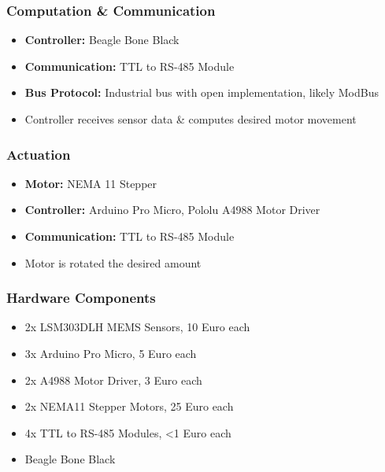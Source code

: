 \documentclass{beamer}
\begin{document}
\begin{frame}
	\frametitle{Computation \& Communication}
	\begin{itemize}
		\item \textbf{Controller:} Beagle Bone Black
		\item \textbf{Communication:} TTL to RS-485 Module
		\item \textbf{Bus Protocol:} Industrial bus with open implementation, likely ModBus
		\item Controller receives sensor data \& computes desired motor movement
	\end{itemize}
\end{frame}

\begin{frame}
	\frametitle{Actuation}
	\begin{itemize}
		\item \textbf{Motor:} NEMA 11 Stepper
		\item \textbf{Controller:} Arduino Pro Micro, Pololu A4988 Motor Driver
		\item \textbf{Communication:} TTL to RS-485 Module
		\item Motor is rotated the desired amount
	\end{itemize}
\end{frame}

\begin{frame}
  \frametitle{Hardware Components}
	\begin{itemize}
		\item 2x LSM303DLH MEMS Sensors, 10 Euro each
		\item 3x Arduino Pro Micro,  5 Euro each
		\item 2x A4988 Motor Driver, 3 Euro each
		\item 2x NEMA11 Stepper Motors, 25 Euro each
		\item 4x TTL to RS-485 Modules, <1 Euro each
		\item Beagle Bone Black
	\end{itemize}
\end{frame}
\end{document}
